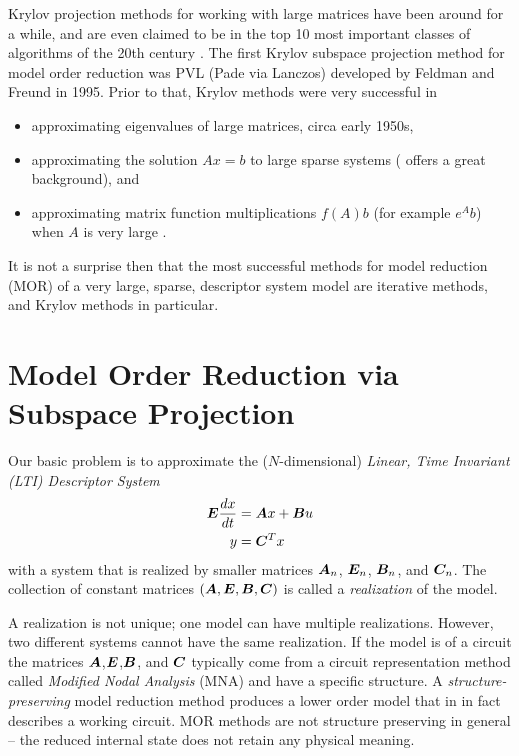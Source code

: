 Krylov projection methods for working with large matrices have been around for a while, and are even claimed to be in the top 10 most important  classes of algorithms of the 20th century \cite{top10alg}.  
The first Krylov subspace projection method for model order reduction was PVL (Pade via Lanczos)  \cite{PVL} developed by Feldman and Freund in 1995.  Prior to that, Krylov methods were very successful in
\begin{itemize}
\item approximating eigenvalues of large matrices,\cite{lanczos,arnoldi} circa early 1950s,  
\item approximating the solution $Ax=b$ to  large sparse systems 
(\cite{saad1981krylov} offers a great background),
 and
\item approximating matrix function multiplications $f(A)b$ (for example $e^A b$) when $A$ is very large \cite{krylov_matfun_eval}.   
\end{itemize}

It is not a surprise then that the most successful methods for model  reduction (MOR) of a very large, sparse, descriptor system model are iterative methods, and Krylov methods in particular.     



\section{Model Order Reduction via Subspace Projection}
         Our basic problem is to approximate the ($N$-dimensional)  \emph{Linear, Time Invariant (LTI) Descriptor System}
         \begin{equation}
         \begin{aligned}
                \bm{E}\frac{dx}{dt} &=  \bm{A} x + \bm{B} u\\
                y &= \bm{C}^T x
        \end{aligned}
        \label{eq:ds1}
        \end{equation}      
with a system that is realized by smaller matrices $\bm{A}_n$, $\bm{E}_n$, $\bm{B}_n$, and $\bm{C}_n$.  
The collection of constant matrices $(\bm{A},\bm{E},\bm{B},\bm{C})$ is called a
\emph{realization}  of the model. 

 A realization is not unique; one model can have multiple realizations.  However, two different systems cannot have the same realization.  If the model is of a circuit the matrices $\bm{A}$,$\bm{E}$,$\bm{B}$, and $\bm{C}$ typically come from a circuit representation method called \emph{Modified Nodal Analysis} (MNA) \cite{MNA} and have a specific structure.  A \emph{structure-preserving}  model reduction method produces a lower order model that in in fact describes a working circuit.   MOR methods are not structure preserving in general -- the reduced internal state does not retain any physical meaning.  


